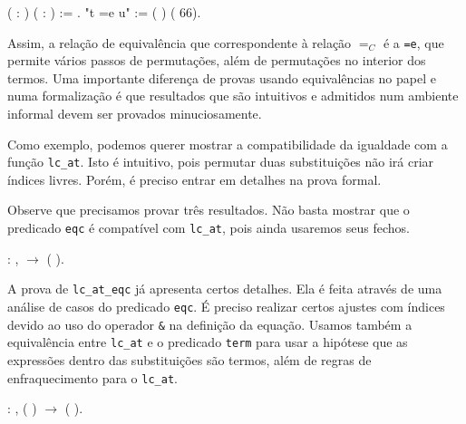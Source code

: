   ( : ) ( : ) :=    .\coqdoceol
{} "t =e u" := (  ) (  66).\coqdoceol
\bigskip

Assim, a relação de equivalência que correspondente à relação $=_C$ é a
\texttt{=e}, que permite vários passos de permutações, além de permutações no
interior dos termos. Uma importante diferença de provas usando equivalências no
papel e numa formalização é que resultados que são intuitivos e admitidos num
ambiente informal devem ser provados minuciosamente.

Como exemplo, podemos querer mostrar a compatibilidade da igualdade com a
função \texttt{lc\_at}. Isto é intuitivo, pois permutar duas substituições não
irá criar índices livres. Porém, é preciso entrar em detalhes na prova formal. 

Observe que precisamos provar três resultados. Não basta mostrar que o predicado
\texttt{eqc} é compatível com \texttt{lc\_at}, pois ainda usaremos seus fechos.

\bigskip 
\coqnoindent {}  :
\coqdockw{\ensuremath{\forall}}   ,
 
  \ensuremath{\rightarrow} (
  
  ).\coqdoceol
\bigskip 

A prova de \texttt{lc\_at\_eqc} já apresenta certos detalhes. Ela é feita
através de uma análise de casos do predicado \texttt{eqc}. É preciso realizar
certos ajustes com índices devido ao uso do operador \texttt{\&} na definição da
equação. Usamos também a equivalência entre \texttt{lc\_at} e o
predicado \texttt{term} para usar a hipótese que as expressões dentro das
substituições são termos, além de regras de enfraquecimento para o
\texttt{lc\_at}.

\bigskip 
\coqnoindent {}  :
\coqdockw{\ensuremath{\forall}}   ,
( )  
\ensuremath{\rightarrow} ( 
 
  ).\coqdoceol
\bigskip 

